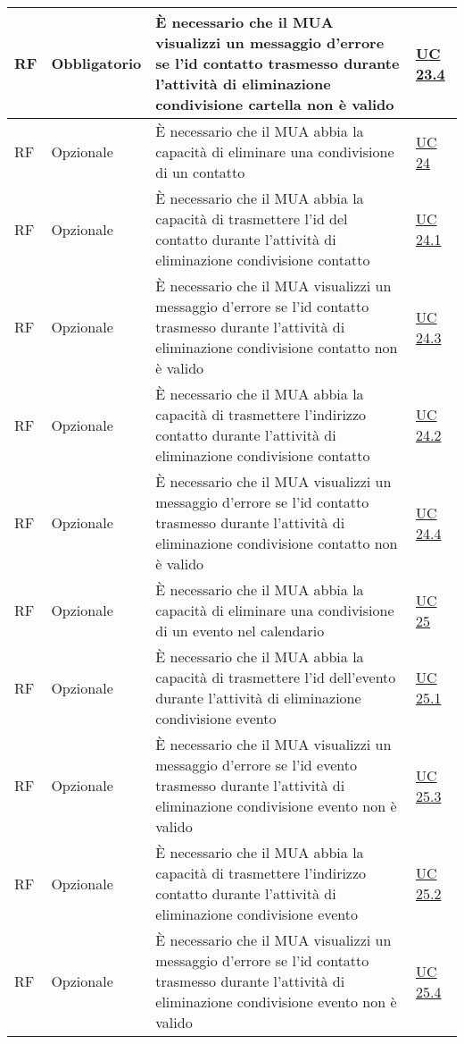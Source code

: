 \begin{longtable}{*{1}{>{\centering\arraybackslash}p{1.5cm}}*{1}{>{\centering\arraybackslash}p{2.5cm}}p{6cm}*{1}{>{\centering\arraybackslash}p{3cm}}}
    \\\hline
    RF & Obbligatorio & È necessario che il MUA visualizzi un messaggio d'errore se l'id contatto trasmesso durante l'attività di eliminazione condivisione cartella non è valido & \hyperref[sec:UC23.4]{UC 23.4}
    \\\hline
    RF & Opzionale & È necessario che il MUA abbia la capacità di eliminare una condivisione di un contatto & \hyperref[sec:UC24]{UC 24}
    \\\hline
    RF & Opzionale & È necessario che il MUA abbia la capacità di trasmettere l'id del contatto durante l'attività di eliminazione condivisione contatto & \hyperref[sec:UC24.1]{UC 24.1}
    \\\hline
    RF & Opzionale & È necessario che il MUA visualizzi un messaggio d'errore se l'id contatto trasmesso durante l'attività di eliminazione condivisione contatto non è valido & \hyperref[sec:UC24.3]{UC 24.3}
    \\\hline
    RF & Opzionale & È necessario che il MUA abbia la capacità di trasmettere l'indirizzo contatto durante l'attività di eliminazione condivisione contatto & \hyperref[sec:UC24.2]{UC 24.2}
    \\\hline
    RF & Opzionale & È necessario che il MUA visualizzi un messaggio d'errore se l'id contatto trasmesso durante l'attività di eliminazione condivisione contatto non è valido & \hyperref[sec:UC24.4]{UC 24.4}
    \\\hline
    RF & Opzionale & È necessario che il MUA abbia la capacità di eliminare una condivisione di un evento nel calendario & \hyperref[sec:UC25]{UC 25}
    \\\hline
    RF & Opzionale & È necessario che il MUA abbia la capacità di trasmettere l'id dell'evento durante l'attività di eliminazione condivisione evento & \hyperref[sec:UC25.1]{UC 25.1}
    \\\hline
    RF & Opzionale & È necessario che il MUA visualizzi un messaggio d'errore se l'id evento trasmesso durante l'attività di eliminazione condivisione evento non è valido & \hyperref[sec:UC25.3]{UC 25.3}
    \\\hline
    RF & Opzionale & È necessario che il MUA abbia la capacità di trasmettere l'indirizzo contatto durante l'attività di eliminazione condivisione evento & \hyperref[sec:UC25.2]{UC 25.2}
    \\\hline
    RF & Opzionale & È necessario che il MUA visualizzi un messaggio d'errore se l'id contatto trasmesso durante l'attività di eliminazione condivisione evento non è valido & \hyperref[sec:UC25.4]{UC 25.4}

\end{longtable}

